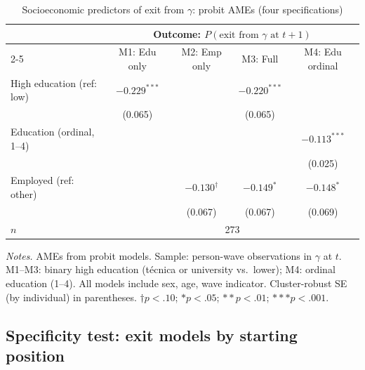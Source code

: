 \documentclass[12pt, a4paper]{article}
\newcommand{\tablenote}[1]{\vspace{4pt}\par\footnotesize\textit{Notes.} #1}
\begin{document}
\begin{table}[H]
\centering
\caption{Socioeconomic predictors of exit from $\gamma$: probit AMEs (four specifications)}
\label{tab:A6_exits}
\small
\begin{tabular}{lcccc}
\hline\hline
  & \multicolumn{4}{c}{Outcome: $P(\text{exit from } \gamma \text{ at } t+1)$} \\
  \cmidrule(lr){2-5}
  & M1: Edu only & M2: Emp only & M3: Full & M4: Edu ordinal \\
\hline
  High education (ref: low)   & $-0.229^{***}$ &              & $-0.220^{***}$ &               \\
                              & (0.065)        &              & (0.065)       &               \\
  Education (ordinal, 1--4)   &                &              &               & $-0.113^{***}$\\
                              &                &              &               & (0.025)       \\
  Employed (ref: other)       &                & $-0.130^{\dagger}$ & $-0.149^{*}$ & $-0.148^{*}$ \\
                              &                & (0.067)      & (0.067)       & (0.069)       \\
\hline
  $n$                         & \multicolumn{4}{c}{273} \\
\hline\hline
\end{tabular}
\tablenote{AMEs from probit models. Sample: person-wave observations in $\gamma$ at $t$.
M1--M3: binary high education (t\'{e}cnica or university vs.\ lower);
M4: ordinal education (1--4). All models include sex, age, wave indicator.
Cluster-robust SE (by individual) in parentheses.
$\dagger p<.10$; $* p<.05$; $** p<.01$; $*** p<.001$.}
\end{table}

\subsection{Specificity test: exit models by starting position}
\end{document}
